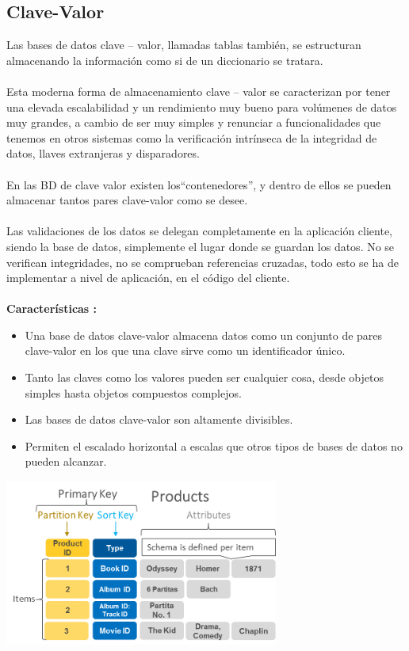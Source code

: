 \documentclass[%
 reprint,
 amsmath,amssymb,
 aps,
]{revtex4-1}
\begin{document}
\subsection{Clave-Valor}
Las bases de datos clave – valor, llamadas tablas también, se estructuran almacenando la información como si de un diccionario se tratara. \\\\ 
Esta moderna forma de almacenamiento clave – valor se caracterizan por tener una elevada escalabilidad y un rendimiento muy bueno para volúmenes de datos muy grandes,  a cambio de ser muy simples y renunciar a funcionalidades que tenemos en otros sistemas como la verificación intrínseca de la integridad de datos, llaves extranjeras y disparadores. \\\\
En las BD de clave valor existen los“contenedores”, y dentro de ellos se pueden almacenar tantos pares clave-valor como se desee. \\\\ Las validaciones de los datos se delegan completamente en la aplicación cliente, siendo la base de datos, simplemente el lugar donde se guardan los datos. No se verifican integridades, no se comprueban referencias cruzadas, todo esto se ha de implementar a nivel de aplicación, en el código del cliente.\\\\
\textbf{Características :}
\begin{itemize}
		\item Una base de datos clave-valor almacena datos como un conjunto de pares clave-valor en los que una clave sirve como un identificador único.
		\item  Tanto las claves como los valores pueden ser cualquier cosa, desde objetos simples hasta objetos compuestos complejos. 
		\item Las bases de datos clave-valor son altamente divisibles.
		\item Permiten el escalado horizontal a escalas que otros tipos de bases de datos no pueden alcanzar.                
\end{itemize}
  \begin{center}
	\includegraphics[width=9cm]{./Imagenes/clave1}
\end{center}	
\end{document}
